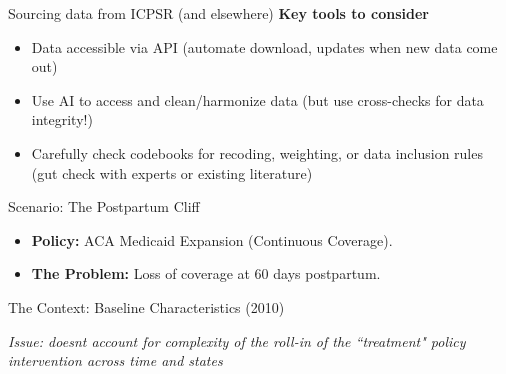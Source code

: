 \documentclass[aspectratio=169, 10pt]{beamer}
\begin{document}
\begin{frame}{Sourcing data from ICPSR (and elsewhere)}
    \textbf{Key tools to consider}
    \vfill
    \begin{itemize}
        \item Data accessible via API (automate download, updates when new data come out)
        \item Use AI to access and clean/harmonize data (but use cross-checks for data integrity!)
        \item Carefully check codebooks for recoding, weighting, or data inclusion rules (gut check with experts or existing literature)
    \end{itemize}
\end{frame}


\begin{frame}{Scenario: The Postpartum Cliff}
    \begin{itemize}
        \item \textbf{Policy:} ACA Medicaid Expansion (Continuous Coverage).
        \item \textbf{The Problem:} Loss of coverage at 60 days postpartum.
    \end{itemize}
    \vfill
    \centering
\end{frame}

\begin{frame}{The Context: Baseline Characteristics (2010)}
    \centering
    
    \vfill
    \footnotesize \textit{Issue: doesnt account for complexity of the roll-in of the ``treatment" policy intervention across time and states}
\end{frame}
\end{document}
